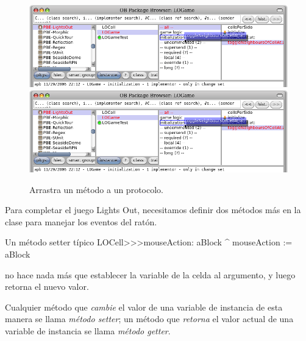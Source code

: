 \documentclass[a4paper,10pt,twoside]{book}
\begin{document}
\begin{figure}[htbp]
   \centering
   \ifluluelse
		{\includegraphics[width=\textwidth]{DragMethod} }
		{\includegraphics[scale=0.7]{DragMethod} }
   \caption{Arrastra un m\'etodo a un protocolo.}
\end{figure}

Para completar el juego Lights Out, necesitamos definir dos m\'etodos m\'as en la clase  para manejar los eventos del rat\'on.
\begin{method}[mouseAction:]{Un m\'etodo setter t\'ipico}
LOCell>>>mouseAction: aBlock
   ^ mouseAction := aBlock
\end{method}

 no hace nada m\'as que establecer la variable  de la celda al argumento, y luego retorna el nuevo valor.

Cualquier m\'etodo que \emph{cambie} el valor de una variable de instancia de esta manera se llama \emph{m\'etodo setter}; un m\'etodo que \emph{retorna} el valor actual de una variable de instancia se llama \emph{m\'etodo getter}.
\end{document}
